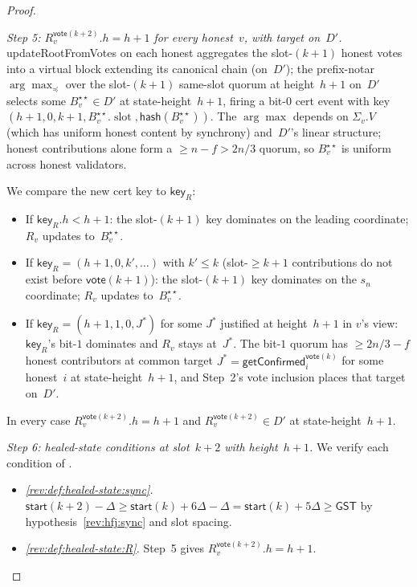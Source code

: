 \ifx\litemode\undefined\documentclass{article}\fi
\newcommand{\slot}[0]{\ensuremath{\operatorname{\mathrm{slot}}}}
\newcommand{\hash}{\mathsf{hash}}
\newcommand{\key}{\mathsf{key}}
\newcommand{\start}{\mathsf{start}}
\newcommand{\vote}{\mathsf{vote}}
\newcommand{\updateRootFromVotes}{\textsf{updateRootFromVotes}\xspace}
\newcommand{\getConfirmed}{\textsf{getConfirmed}\xspace}
\theoremstyle{plain}
\theoremstyle{definition}
\theoremstyle{remark}
\newcommand{\GST}{\ensuremath{\mathsf{GST}}}
\begin{document}
\begin{proof}
\begin{description}
\begin{description}
\emph{Step 5: $R_v^{\vote(k+2)}.h = h+1$ for every honest~$v$, with target on~$D'$.}
\updateRootFromVotes{} on each honest aggregates the slot-$(k+1)$ honest votes into a virtual block extending its canonical chain (on~$D'$); the prefix-notar $\arg\max_\preceq$ over the slot-$(k+1)$ same-slot quorum at height~$h+1$ on~$D'$ selects some $B^{\star\star}_v \in D'$ at state-height~$h+1$, firing a bit-$0$ cert event with key $(h+1, 0, k+1, B^{\star\star}_v.\slot, \hash(B^{\star\star}_v))$. The $\arg\max$ depends on $\Sigma_v.V$ (which has uniform honest content by synchrony) and~$D'$'s linear structure; honest contributions alone form a $\geq n - f > 2n/3$ quorum, so $B^{\star\star}_v$ is uniform across honest validators.

We compare the new cert key to $\key_R$:
\begin{itemize}
  \item If $\key_R.h < h+1$: the slot-$(k+1)$ key dominates on the leading coordinate; $R_v$ updates to~$B^{\star\star}_v$.
  \item If $\key_R = (h+1, 0, k', \ldots)$ with $k' \leq k$ (slot-$\geq k+1$ contributions do not exist before $\vote(k+1)$): the slot-$(k+1)$ key dominates on the $s_n$ coordinate; $R_v$ updates to~$B^{\star\star}_v$.
  \item If $\key_R = (h+1, 1, 0, J^*)$ for some $J^*$ justified at height~$h+1$ in $v$'s view: $\key_R$'s bit-$1$ dominates and $R_v$ stays at~$J^*$. The bit-$1$ quorum has $\geq 2n/3 - f$ honest contributors at common target $J^* = \getConfirmed_i^{\vote(k)}$ for some honest~$i$ at state-height~$h+1$, and Step~2's vote inclusion places that target on~$D'$.
\end{itemize}
In every case $R_v^{\vote(k+2)}.h = h+1$ and $R_v^{\vote(k+2)} \in D'$ at state-height~$h+1$.

\emph{Step 6: healed-state conditions at slot~$k+2$ with height~$h+1$.}
We verify each condition of .
\begin{itemize}
  \item \emph{\ref{rev:def:healed-state:sync}.}
  $\start(k+2) - \Delta \geq \start(k) + 6\Delta - \Delta = \start(k) + 5\Delta \geq \GST$ by hypothesis~\ref{rev:hfj:sync} and slot spacing.

  \item \emph{\ref{rev:def:healed-state:R}.}
  Step~5 gives $R_v^{\vote(k+2)}.h = h+1$.


\end{itemize}
\end{description}
\end{description}
\end{proof}
\end{document}
